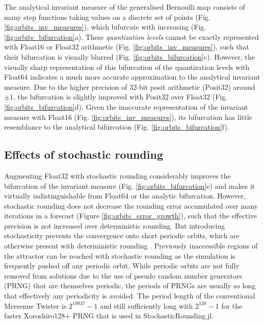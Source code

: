 The analytical invariant measure of the generalised Bernoulli map consists of many step functions taking values on a discrete set
of points (Fig. \ref{fig:orbits_inv_measures}), which bifurcate with increasing (Fig. \ref{fig:orbits_bifurcation}a). These \emph{quantization levels}
cannot be exactly represented with Float16 or Float32 arithmetic (Fig. \ref{fig:orbits_inv_measures}), such that their bifurcation is visually
blurred (Fig. \ref{fig:orbits_bifurcation}c). However, the visually sharp representation of this bifurcation of the quantization levels with Float64
indicates a much more accurate approximation to the analytical invariant measure. Due to the higher precision of 32-bit posit arithmetic
(Posit32) around $\pm1$, the bifurcation is slightly improved with Posit32 over Float32 (Fig. \ref{fig:orbits_bifurcation}d). Given the
inaccurate representation of the invariant measure with Float16 (Fig. \ref{fig:orbits_inv_measures}), its bifurcation has little resemblance
to the analytical bifurcation (Fig. \ref{fig:orbits_bifurcation}f).

\subsection{Effects of stochastic rounding}
\label{sec:orbits_stochastic_rounding}

Augmenting Float32 with stochastic rounding considerably improves the bifurcation of the invariant measure (Fig. \ref{fig:orbits_bifurcation}e)
and makes it virtually indistinguishable from Float64 or the analytic bifurcation. However, stochastic rounding does not decrease the rounding
error accumulated over many iterations in a forecast (Figure \ref{fig:orbits_error_growth}), such that the effective precision is not increased
over deterministic rounding. But introducing stochasticity prevents the convergence onto short periodic orbits, which are otherwise present
with deterministic rounding \citep{Boghosian2019}. Previously inaccessible regions of the attractor can be reached with stochastic rounding
as the simulation is frequently pushed off any periodic orbit. While periodic orbits are not fully removed from solutions due to the use of
pseudo random number generators (PRNG) that are themselves periodic, the periods of PRNGs are usually so long that effectively any
periodicity is avoided. The period length of the conventional Mersenne Twister \citep{Matsumoto1998} is $2^{19937}-1$ and still sufficiently
long with $2^{128} - 1$ for the faster Xoroshiro128+ \citep{Blackman2019} PRNG that is used in StochasticRounding.jl.

